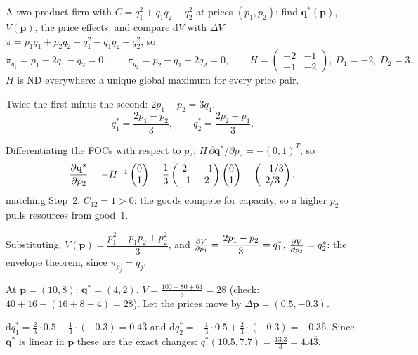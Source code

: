\begin{worked}{A two-product firm with $C=q_1^{2}+q_1q_2+q_2^{2}$ at prices $(p_1,p_2)$: find $\mathbf{q}^*(\mathbf{p})$, $V(\mathbf{p})$, the price effects, and compare $\mathrm{d}V$ with $\Delta V$}
$\pi=p_1q_1+p_2q_2-q_1^{2}-q_1q_2-q_2^{2}$, so
\[
  \pi_{q_1}=p_1-2q_1-q_2=0,\qquad \pi_{q_2}=p_2-q_1-2q_2=0,
  \qquad
  H=\begin{pmatrix}-2&-1\\-1&-2\end{pmatrix},\ D_1=-2,\ D_2=3 .
\]
$H$ is ND everywhere: a unique global maximum for every price pair.

 Twice the first minus the second: $2p_1-p_2=3q_1$.
\[
  q_1^*=\frac{2p_1-p_2}{3},\qquad q_2^*=\frac{2p_2-p_1}{3}.
\]

 Differentiating
the FOCs with respect to $p_2$: $H\,\partial\mathbf{q}^*/\partial p_2
=-(0,1)^{T}$, so
\[
  \frac{\partial \mathbf{q}^*}{\partial p_2}=-H^{-1}\begin{pmatrix}0\\1\end{pmatrix}
  =\frac13\begin{pmatrix}2&-1\\-1&2\end{pmatrix}\begin{pmatrix}0\\1\end{pmatrix}
  =\begin{pmatrix}-1/3\\2/3\end{pmatrix},
\]
matching Step~2. $C_{12}=1>0$: the goods compete for capacity, so a higher
$p_2$ pulls resources from good~1.

 Substituting,
$V(\mathbf{p})=\dfrac{p_1^{2}-p_1p_2+p_2^{2}}{3}$, and
$\frac{\partial V}{\partial p_1}=\dfrac{2p_1-p_2}{3}=q_1^*$,
$\frac{\partial V}{\partial p_2}=q_2^*$: the envelope theorem, since $\pi_{p_j}=q_j$.

 At $\mathbf{p}=(10,8)$: $\mathbf{q}^*=(4,2)$,
$V=\tfrac{100-80+64}{3}=28$ (check: $40+16-(16+8+4)=28$). Let the prices
move by $\Delta\mathbf{p}=(0.5,-0.3)$.

$\mathrm{d}q_1^*=\tfrac23\cdot0.5-\tfrac13\cdot(-0.3)=0.4\overline3$ and
$\mathrm{d}q_2^*=-\tfrac13\cdot0.5+\tfrac23\cdot(-0.3)=-0.3\overline6$.
Since $\mathbf{q}^*$ is linear in $\mathbf{p}$ these are the exact changes:
$q_1^*(10.5,7.7)=\tfrac{13.3}{3}=4.4\overline3$.


\end{worked}

